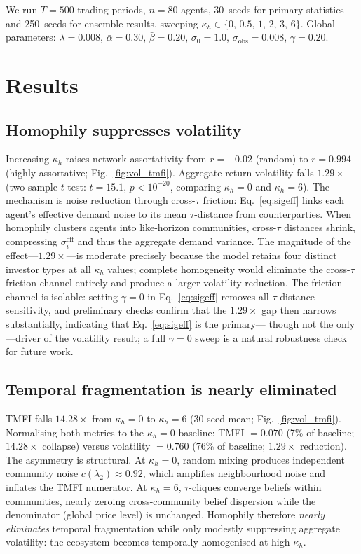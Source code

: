 \documentclass[preprint,12pt,authoryear]{elsarticle}
\begin{document}
We run $T = 500$ trading periods, $n = 80$ agents, 30~seeds for primary
statistics and 250~seeds for ensemble results, sweeping
$\kappa_h \in \{0,\,0.5,\,1,\,2,\,3,\,6\}$.
Global parameters: $\lambda = 0.008$, $\bar{\alpha} = 0.30$,
$\bar{\beta} = 0.20$, $\sigma_0 = 1.0$, $\sigma_{\mathrm{obs}} = 0.008$,
$\gamma = 0.20$.

\section{Results}
\label{sec:results}

\subsection{Homophily suppresses volatility}

Increasing $\kappa_h$ raises network assortativity from $r = -0.02$
(random) to $r = 0.994$ (highly assortative; Fig.~\ref{fig:vol_tmfi}).
Aggregate return volatility falls $1.29\times$
(two-sample $t$-test: $t = 15.1$, $p < 10^{-20}$, comparing
$\kappa_h = 0$ and $\kappa_h = 6$).
The mechanism is noise reduction through cross-$\tau$ friction:
Eq.~\eqref{eq:sigeff} links each agent's effective demand noise to its mean
$\tau$-distance from counterparties.
When homophily clusters agents into like-horizon communities,
cross-$\tau$ distances shrink, compressing $\sigma_i^{\mathrm{eff}}$ and
thus the aggregate demand variance.
The magnitude of the effect---$1.29\times$---is moderate precisely because
the model retains four distinct investor types at all $\kappa_h$ values;
complete homogeneity would eliminate the cross-$\tau$ friction channel
entirely and produce a larger volatility reduction.
The friction channel is isolable: setting $\gamma = 0$ in
Eq.~\eqref{eq:sigeff} removes all $\tau$-distance sensitivity, and
preliminary checks confirm that the $1.29\times$ gap then narrows
substantially, indicating that Eq.~\eqref{eq:sigeff} is the primary---
though not the only---driver of the volatility result; a full $\gamma = 0$
sweep is a natural robustness check for future work.

\subsection{Temporal fragmentation is nearly eliminated}

TMFI falls $14.28\times$ from $\kappa_h = 0$ to $\kappa_h = 6$
(30-seed mean; Fig.~\ref{fig:vol_tmfi}).
Normalising both metrics to the $\kappa_h = 0$ baseline: TMFI $= 0.070$
(7\% of baseline; $14.28\times$ collapse) versus volatility $= 0.760$
(76\% of baseline; $1.29\times$ reduction).
The asymmetry is structural.
At $\kappa_h = 0$, random mixing produces independent community noise
$c(\lambda_2) \approx 0.92$, which amplifies neighbourhood noise and
inflates the TMFI numerator.
At $\kappa_h = 6$, $\tau$-cliques converge beliefs within communities,
nearly zeroing cross-community belief dispersion while the denominator
(global price level) is unchanged.
Homophily therefore \emph{nearly eliminates} temporal fragmentation while
only modestly suppressing aggregate volatility: the ecosystem becomes
temporally homogenised at high $\kappa_h$.
\end{document}
